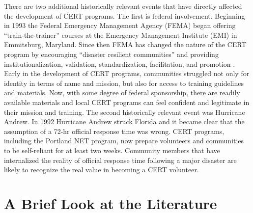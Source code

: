\documentclass[11pt,fleqn]{book} %
\begin{document}
\noindent There are two additional historically relevant events that have directly affected the development of CERT programs. The first is federal involvement. Beginning in 1993 the Federal Emergency Management Agency (FEMA) began offering \enquote{train-the-trainer} courses at the Emergency Management Institute (EMI) in Emmitsburg, Maryland. Since then FEMA has changed the nature of the CERT program by encouraging \enquote{disaster resilient communities} and providing institutionalization, validation, standardization, facilitation, and promotion \autocite{simpson_community_2001}. Early in the development of CERT programs, communities struggled not only for identity in terms of name and mission, but also for access to training guidelines and materials. Now, with some degree of federal sponsorship, there are readily available materials and local CERT programs can feel confident and legitimate in their mission and training. The second historically relevant event was Hurricane Andrew. In 1992 Hurricane Andrew struck Florida and it became clear that the assumption of a 72-hr official response time was wrong. CERT programs, including the Portland NET program, now prepare volunteers and communities to be self-reliant for at least two weeks. Community members that have internalized the reality of official response time following a major disaster are likely to recognize the real value in becoming a CERT volunteer.


\chapter{A Brief Look at the Literature}
\end{document}
